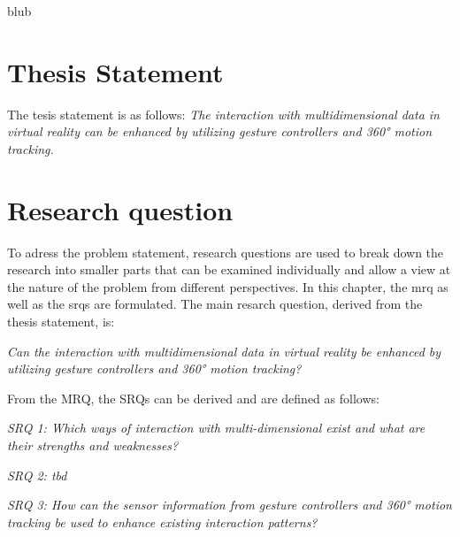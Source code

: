 blub



\section{Thesis Statement}

The tesis statement is as follows: \newline
\textit{The interaction with multidimensional data in virtual reality can be enhanced by utilizing gesture controllers and 360° motion tracking.}



\section{Research question}

To adress the problem statement, research questions are used to break down the research into smaller parts that can be examined individually and allow a view at the nature of the problem from different perspectives.
In this chapter, the \gls{mrq} as well as the \glspl{srq} are formulated. \newline
The main resarch question, derived from the thesis statement, is:
\begin{framed}
	\textit{Can the interaction with multidimensional data in virtual reality be enhanced by utilizing gesture controllers and 360° motion tracking?}
\end{framed} \label{MRQ}
From the MRQ, the SRQs can be derived and are defined as follows:
\begin{framed}
	\textit{SRQ 1: Which ways of interaction with multi-dimensional exist and what are their strengths and weaknesses?}
\end{framed} \label{SRQ1}
\begin{framed}
	\textit{SRQ 2: tbd}
\end{framed} \label{SRQ2}
\begin{framed}
	\textit{SRQ 3: How can the sensor information from gesture controllers and 360° motion tracking be used to enhance existing interaction patterns?}
\end{framed} \label{SRQ3}
 

